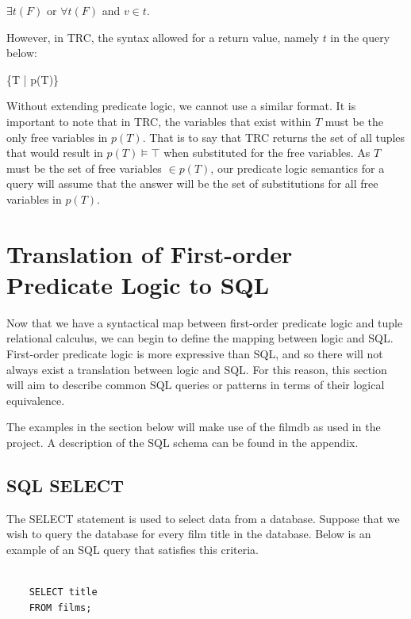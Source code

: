 \documentclass[a4paper, 11pt]{article}
\begin{document}
      $\exists t(F)$ or $\forall t(F)$ and $v \in t$.

      However, in TRC, the syntax allowed for a return value, namely $t$ in the
      query below:

      \{T | p(T)\}

      Without extending predicate logic, we cannot use a similar format.
      It is important to note that in TRC, the variables that exist
      within $T$ must be the only free variables in $p(T)$. That is to say that
      TRC returns the set of all tuples that would result in $p(T) \models
      \top$ when substituted for the free variables. As $T$ must be the set of
      free variables $\in p(T)$, our predicate logic semantics for a query will
      assume that the answer will be the set of substitutions for all free
      variables in $p(T)$.

  \section{Translation of First-order Predicate Logic to SQL}

    Now that we have a syntactical map between first-order predicate logic and
    tuple relational calculus, we can begin to define the mapping between logic
    and SQL. First-order predicate logic
    is more expressive than SQL, and so there will not always exist a
    translation between logic and SQL. For this reason, this section will aim
    to describe common SQL queries or patterns in terms of their logical
    equivalence.

    The examples in the section below will make use of the filmdb as used in
    the project. A description of the SQL schema can be found in the appendix.

    \subsection{SQL SELECT}

    The SELECT statement is used to select data from a database.\cite{w3SELECT}
    Suppose that we wish to query the database for every film title in the
    database. Below is an example of an SQL query that satisfies this criteria.

    \begin{verbatim}

    SELECT title
    FROM films;

    \end{verbatim}
\end{document}
